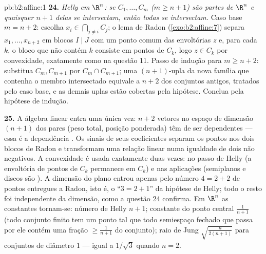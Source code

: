 \begin{solution}{pb:b2:affine:1}
\textbf{24.} \emph{Helly em $\R^n$: se $C_1, \dots, C_m$
($m \geq n + 1$) são partes  de $\R^n$ e quaisquer $n + 1$
delas se intersectam, então todas se intersectam.} Caso base $m = n +
2$: escolha $x_i \in \bigcap_{j\neq i}C_j$; o lema de Radon
(\cref{exo:b2:affine:7}) separa $x_1, \dots, x_{n+2}$ em
blocos $I \mid J$ com um ponto comum das envoltórias $z$ e, para cada
$k$, o bloco que não contém $k$ consiste em pontos de
$C_k$, logo $z \in C_k$ por convexidade, exatamente como na questão
11. Passo de indução para $m \geq n + 2$: substitua $C_m,
C_{m+1}$ por $C_m \cap C_{m+1}$; uma $(n+1)$-upla da nova
família que contenha o membro intersectado equivale a $n + 2$
dos conjuntos antigos, tratados pelo caso base, e as demais
uplas estão cobertas pela hipótese. Conclua pela hipótese
de indução.

\textbf{25.} A álgebra linear entra uma única vez: $n + 2$ vetores no
espaço de dimensão $(n+1)$ dos pares (peso total,
posição ponderada) têm de ser dependentes --- essa é a dependência
. Os sinais de seus coeficientes separam os pontos
nos dois blocos de Radon e transformam uma relação linear numa
igualdade de dois  não negativos. A convexidade é usada
exatamente duas vezes: no passo de Helly (a envoltória de pontos de $C_k$
permanece em $C_k$) e nas aplicações (semiplanos e
discos são ). A dimensão do plano entrou apenas
pelo número $4 = 2 + 2$ de pontos entregues a Radon, isto é,
o ``$3 = 2 + 1$'' da hipótese de Helly; todo o resto
foi independente da dimensão, como a questão 24 confirma. Em $\R^n$ as
constantes tornam-se: número de Helly $n + 1$; constante do ponto central
$\frac1{n+1}$ (todo conjunto finito tem um ponto tal que todo
semiespaço fechado que passa por ele contém uma fração $\geq
\frac1{n+1}$ do conjunto); raio de Jung
$\sqrt{\frac{n}{2(n+1)}}$ para conjuntos de diâmetro $1$ --- igual
a $1/\sqrt3$ quando $n = 2$.
\end{solution}
